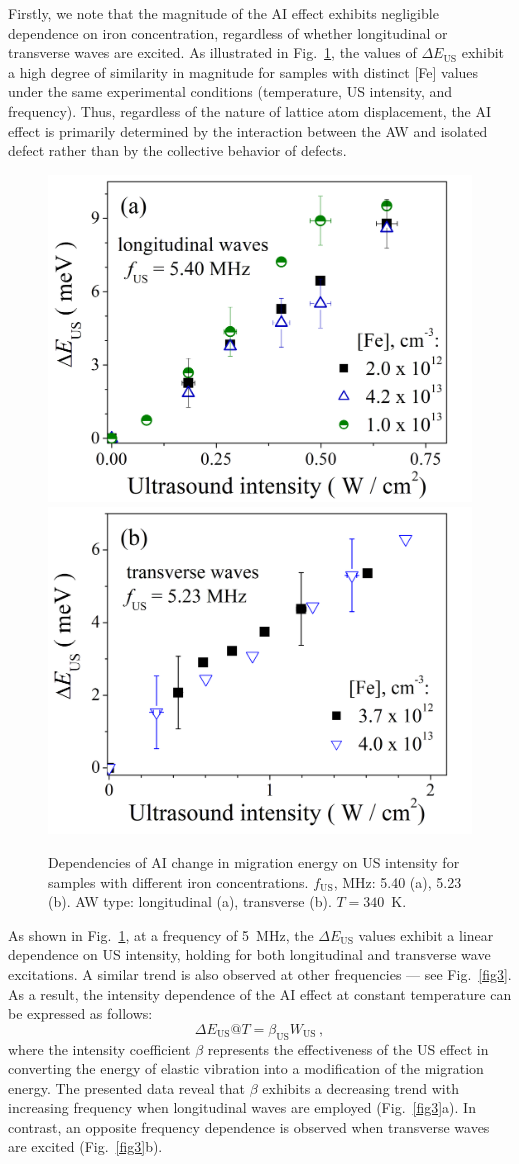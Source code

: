 \documentclass{ttp}
\begin{document}
Firstly, we note that the magnitude of the AI effect exhibits negligible dependence
on iron concentration, regardless of whether longitudinal or transverse waves are excited.
As illustrated in Fig.~\ref{fig2}, the values of $\Delta E_\mathrm{US}$ exhibit a high degree of similarity
in magnitude for samples with distinct [Fe] values under the same experimental conditions
(temperature, US intensity, and frequency).
Thus, regardless of the nature of lattice atom displacement,
the AI effect is primarily determined by the interaction between the AW and isolated defect
rather than by the collective behavior of defects.

\begin{figure}
	\centering
     \includegraphics[width=0.4\linewidth]{Fig2a.png}
     \includegraphics[width=0.4\linewidth]{Fig2b.png}
	  \caption{Dependencies of AI change in migration energy on US intensity for
       samples with different  iron concentrations.
       $f_\mathrm{US}$, MHz: 5.40 (a), 5.23 (b).
       AW type: longitudinal (a), transverse (b).
       $T=340$~K.
}\label{fig2}
\end{figure}

As shown in Fig.~\ref{fig2}, at a frequency of 5~MHz,
the $\Delta E_\mathrm{US}$ values exhibit a linear dependence on US intensity,
holding for both longitudinal and transverse wave excitations.
A similar trend is also observed at other frequencies --- see Fig.~\ref{fig3}.
As a result, the intensity dependence of the AI effect at constant temperature can be expressed as follows:
\begin{equation}\label{eq3O}
  \Delta E_\mathrm{US}@ T = \beta_\mathrm{US} W_\mathrm{US}\,,
\end{equation}
where
the intensity coefficient $\beta$ represents the effectiveness of the US effect
in converting the energy of elastic vibration into a modification of the migration energy.
The presented data reveal that $\beta$ exhibits a decreasing trend
with increasing frequency when longitudinal waves are employed (Fig.~\ref{fig3}a).
In contrast, an opposite frequency dependence is observed when transverse waves are excited (Fig.~\ref{fig3}b).
\end{document}
